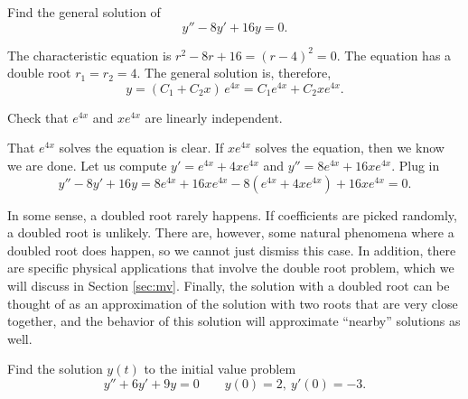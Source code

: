 \documentclass{ximera}
\begin{document}

\begin{example}
    Find the general solution of
    \begin{equation*}
        y'' -8 y' + 16 y = 0 .
    \end{equation*}
\end{example}

\begin{exampleSol}
    The characteristic equation is $r^2 - 8 r + 16 = {(r-4)}^2 = 0$. The equation has a  double root $r_1 = r_2 = 4$.  The general solution is, therefore,
    \begin{equation*}
        y = (C_1 + C_2 x)\, e^{4 x} = C_1 e^{4x} + C_2 x e^{4x} .
    \end{equation*}
    
    \begin{exercise}
        Check that $e^{4x}$ and $x e^{4x}$ are linearly independent.
    \end{exercise}
    
    That $e^{4x}$ solves the equation is clear.  If $x e^{4x}$ solves the equation, then we know we are done.  Let us compute $y' = e^{4x} + 4xe^{4x}$ and $y'' = 8 e^{4x} + 16xe^{4x}$.  Plug in
    \begin{equation*}
        y'' - 8 y' + 16 y =  8 e^{4x} + 16xe^{4x} - 8(e^{4x} + 4xe^{4x}) + 16 xe^{4x} = 0 .
    \end{equation*}
\end{exampleSol}

In some sense, a doubled root rarely happens.  If coefficients are picked randomly, a doubled root is unlikely. There are, however, some natural phenomena where a doubled root does happen, so we cannot just dismiss this case. In addition, there are specific physical applications that involve the double root problem, which we will discuss in Section \ref{sec:mv}. Finally, the solution with a doubled root can be thought of as an approximation of the solution with two roots that are very close together, and the behavior of this solution will approximate ``nearby'' solutions as well. 


\begin{example}
    Find the solution $y(t)$ to the initial value problem
    \begin{equation*}
        y'' + 6y' + 9y = 0 \qquad y(0) = 2,\ y'(0) = -3.
    \end{equation*}
\end{example}
\end{document}
